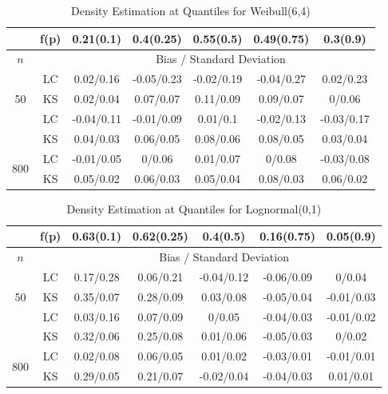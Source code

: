 \documentclass[10pt]{article}
\begin{document}
\begin{center}
\begin{table}[H]
\begin{tabular} {| c | c | c | c | c | c | c | }
\end{tabular}
\end{table}
	
	
\begin{table}[H]

\caption{Density Estimation at Quantiles for Weibull(6,4)}
\begin{tabular} {| c | c | c | c | c | c | c | } 

	 \hline
		&f(p)&	0.21(0.1)&	0.4(0.25)&	0.55(0.5)&	0.49(0.75)&	0.3(0.9)\\ 
 \hline 
 	$n$ & & \multicolumn{5}{|c|}{Bias / Standard Deviation} 
 \\ 
 \hline 
\multirow{3}{*}{50}		&	LC	&0.02/0.16	&-0.05/0.23	&-0.02/0.19	&-0.04/0.27	&0.02/0.23\\ 
			&	KS	&0.02/0.04	&0.07/0.07	&0.11/0.09	&0.09/0.07	&0/0.06\\ 
	\hline 
\multirow{3}{*}{200}		&	LC	&-0.04/0.11	&-0.01/0.09	&0.01/0.1	&-0.02/0.13	&-0.03/0.17\\ 
			&	KS	&0.04/0.03	&0.06/0.05	&0.08/0.06	&0.08/0.05	&0.03/0.04\\ 
	\hline 
\multirow{3}{*}{800}		&	LC	&-0.01/0.05	&0/0.06	&0.01/0.07	&0/0.08	&-0.03/0.08\\ 
			&	KS	&0.05/0.02	&0.06/0.03	&0.05/0.04	&0.08/0.03	&0.06/0.02\\ 
	\hline 

\end{tabular}

\end{table}	

\begin{table}[H]

\caption{Density Estimation at Quantiles for Lognormal(0,1)}

\begin{tabular} {| c | c | c | c | c | c | c | } 

	 \hline
		&f(p)&	0.63(0.1)&	0.62(0.25)&	0.4(0.5)&	0.16(0.75)&	0.05(0.9)\\ 
 \hline 
 	$n$ & & \multicolumn{5}{|c|}{Bias / Standard Deviation} 
 \\ 
 \hline 
\multirow{3}{*}{50}		&	LC	&0.17/0.28	&0.06/0.21	&-0.04/0.12	&-0.06/0.09	&0/0.04\\ 
			&	KS	&0.35/0.07	&0.28/0.09	&0.03/0.08	&-0.05/0.04	&-0.01/0.03\\ 
	\hline 
\multirow{3}{*}{200}		&	LC	&0.03/0.16	&0.07/0.09	&0/0.05	&-0.04/0.03	&-0.01/0.02\\ 
			&	KS	&0.32/0.06	&0.25/0.08	&0.01/0.06	&-0.05/0.03	&0/0.02\\ 
	\hline 
\multirow{3}{*}{800}		&	LC	&0.02/0.08	&0.06/0.05	&0.01/0.02	&-0.03/0.01	&-0.01/0.01\\ 
			&	KS	&0.29/0.05	&0.21/0.07	&-0.02/0.04	&-0.04/0.03	&0.01/0.01\\ 
	\hline 


\end{tabular}
\end{table}
\end{center}
\end{document}
